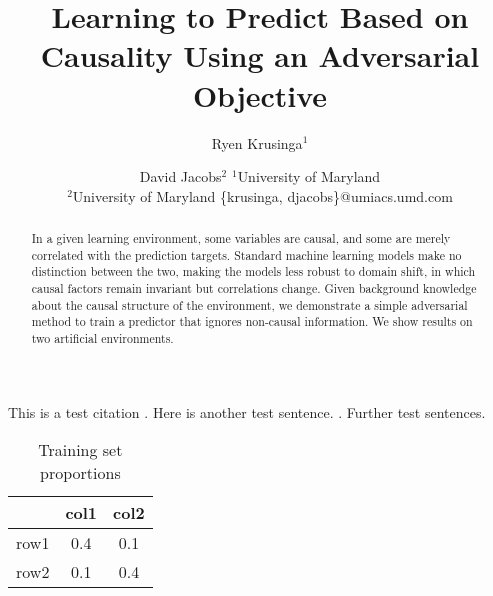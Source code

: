 \documentclass{article}
\title{Learning to Predict Based on Causality Using an Adversarial Objective}
\author{
Ryen Krusinga$^1$
\and
David Jacobs$^2$
\affiliations
$^1$University of Maryland\\
$^2$University of Maryland
\emails
\{krusinga, djacobs\}@umiacs.umd.com
}
\begin{document}
\maketitle

\begin{abstract}
In a given learning environment, some variables are causal, and some are merely correlated with the prediction targets. Standard machine learning models make no distinction between the two, making the models less robust to domain shift, in which causal factors remain invariant but correlations change. Given background knowledge about the causal structure of the environment, we demonstrate a simple adversarial method to train a predictor that ignores non-causal information. We show results on two artificial environments.
\end{abstract}

This is a test citation \cite{Oh2015}. Here is another test sentence. \cite{Oh2015}. Further test sentences.



\begin{table}
\centering
\begin{tabular}{r | c | c}
  & col1 & col2 \\
\hline
row1 & 0.4 & 0.1 \\
\hline
row2 & 0.1 & 0.4
\end{tabular}
\label{tab:prop1}
\caption{Training set proportions}
\end{table}



% 
% 
% 
% 
%
% 
% 
% 
% 
% 






















\end{document}
